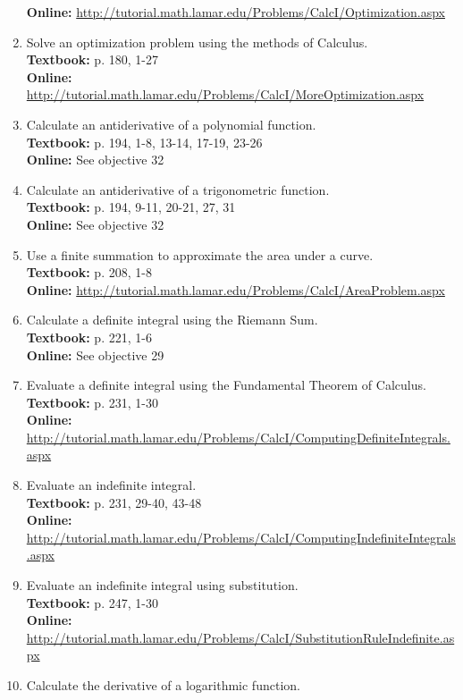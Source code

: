 \documentclass[12pt,landscape]{article}
\begin{document}
\begin{multicols}{2}
\begin{enumerate}
\textbf{Online:} \url{http://tutorial.math.lamar.edu/Problems/CalcI/Optimization.aspx}
\item Solve an optimization problem using the methods of Calculus.\\
\textbf{Textbook:} p. 180, 1-27 \\
\textbf{Online:} \url{http://tutorial.math.lamar.edu/Problems/CalcI/MoreOptimization.aspx}
\item Calculate an antiderivative of a polynomial function.\\
\textbf{Textbook:} p. 194, 1-8, 13-14, 17-19, 23-26\\
\textbf{Online:} See objective 32
\item Calculate an antiderivative of a trigonometric function.\\
\textbf{Textbook:} p. 194, 9-11, 20-21, 27, 31\\
\textbf{Online:} See objective 32
\item Use a finite summation to approximate the area under a curve.\\
\textbf{Textbook:} p. 208, 1-8\\
\textbf{Online:} \url{http://tutorial.math.lamar.edu/Problems/CalcI/AreaProblem.aspx}
\item Calculate a definite integral using the Riemann Sum.\\
\textbf{Textbook:} p. 221, 1-6\\
\textbf{Online:} See objective 29
\vspace{1in}
\item Evaluate a definite integral using the Fundamental Theorem of Calculus.\\
\textbf{Textbook:} p. 231, 1-30 \\
\textbf{Online:} \url{http://tutorial.math.lamar.edu/Problems/CalcI/ComputingDefiniteIntegrals.aspx}
\item Evaluate an indefinite integral.\\
\textbf{Textbook:} p. 231, 29-40, 43-48\\
\textbf{Online:} \url{http://tutorial.math.lamar.edu/Problems/CalcI/ComputingIndefiniteIntegrals.aspx}
\item Evaluate an indefinite integral using substitution.\\
\textbf{Textbook:} p. 247, 1-30\\
\textbf{Online:} \url{http://tutorial.math.lamar.edu/Problems/CalcI/SubstitutionRuleIndefinite.aspx}
\item Calculate the derivative of a logarithmic function.\\

\end{enumerate}
\end{multicols}
\end{document}
